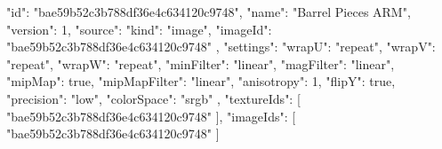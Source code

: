 {
  "id": "bae59b52c3b788df36e4c634120c9748",
  "name": "Barrel Pieces ARM",
  "version": 1,
  "source": {
    "kind": "image",
    "imageId": "bae59b52c3b788df36e4c634120c9748"
  },
  "settings": {
    "wrapU": "repeat",
    "wrapV": "repeat",
    "wrapW": "repeat",
    "minFilter": "linear",
    "magFilter": "linear",
    "mipMap": true,
    "mipMapFilter": "linear",
    "anisotropy": 1,
    "flipY": true,
    "precision": "low",
    "colorSpace": "srgb"
  },
  "textureIds": [
    "bae59b52c3b788df36e4c634120c9748"
  ],
  "imageIds": [
    "bae59b52c3b788df36e4c634120c9748"
  ]
}
